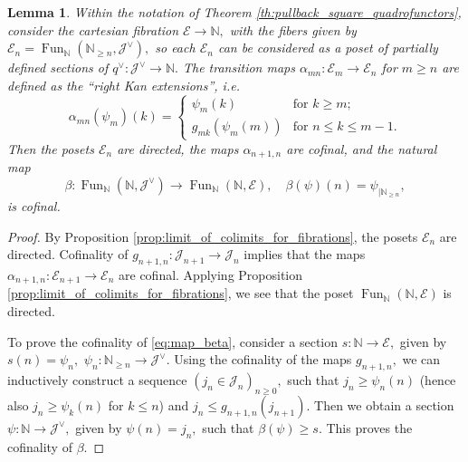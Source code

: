 \documentclass[11pt,leqno]{amsart}
\newtheorem{lemma}[theo]{Lemma}
\numberwithin{equation}{section}
\def\N{\mathbb{N}}
\newcommand{\cJ}{{\mathcal J}}
\newcommand{\cI}{{\mathcal I}}
\newcommand{\cE}{{\mathcal E}}
\newcommand{\Fun}{\operatorname{Fun}}
\begin{document}
\begin{lemma}\label{lem:trick_with_fibrations}
Within the notation of Theorem \ref{th:pullback_square_quadrofunctors}, %
consider the cartesian fibration $\cE\to\N,$ with the fibers given by $\cE_n=\Fun_{\N}(\N_{\geq n},\cJ^{\vee}),$ so each $\cE_n$ can be considered as a poset of partially defined sections of $q^{\vee}:\cJ^{\vee}\to\N.$ The transition maps $\alpha_{mn}:\cE_m\to\cE_n$ for $m\geq n$ are defined as the ``right Kan extensions'', i.e.
\begin{equation}\label{eq:right_Kan_extensions}
\alpha_{mn}(\psi_m)(k)=\begin{cases}
	\psi_m(k) & \text{for }k\geq m;\\
	g_{mk}(\psi_m(m)) & \text{for }n\leq k\leq m-1.\end{cases}
	\end{equation}
	Then the posets $\cE_n$ are directed, the maps $\alpha_{n+1,n}$ are cofinal, and the natural map \begin{equation}\label{eq:map_beta}\beta:\Fun_{\N}(\N,\cJ^{\vee})\to\Fun_{\N}(\N,\cE),\quad \beta(\psi)(n)=\psi_{\mid \N_{\geq n}},\end{equation}
	is cofinal. 
\end{lemma}

\begin{proof}
By Proposition \ref{prop:limit_of_colimits_for_fibrations}, the posets $\cE_n$ are directed. Cofinality of $g_{n+1,n}:\cJ_{n+1}\to\cJ_n$ implies that the maps $\alpha_{n+1,n}:\cE_{n+1}\to\cE_n$ are cofinal. Applying Proposition \ref{prop:limit_of_colimits_for_fibrations}, we see that the poset $\Fun_{\N}(\N,\cE)$ is directed.

To prove the cofinality of \eqref{eq:map_beta}, consider a section $s:\N\to\cE,$ given by $s(n)=\psi_n,$ $\psi_n:\N_{\geq n}\to \cJ^{\vee}.$ Using the cofinality of the maps $g_{n+1,n},$ we can inductively construct a sequence $(j_n\in\cJ_n)_{n\geq 0},$ such that $j_n\geq \psi_n(n)$ (hence also $j_n\geq \psi_k(n)$ for $k\leq n$) and $j_n\leq g_{n+1,n}(j_{n+1}).$
Then we obtain a section $\psi:\N\to\cJ^{\vee},$ given by $\psi(n)=j_n,$ such that $\beta(\psi)\geq s.$ This proves the cofinality of $\beta.$ 
\end{proof}
\end{document}
